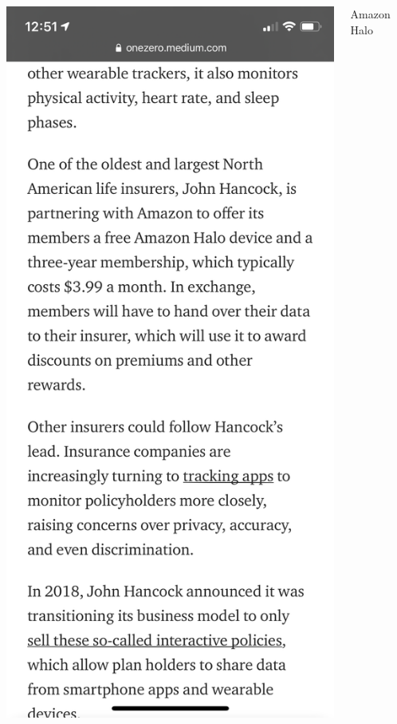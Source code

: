 \documentclass[main]{subfiles}
\begin{document}
\begin{frame}
\begin{columns}
\begin{column}{0.33\textwidth}
{\includegraphics[width=\textwidth]{figures/news/onezeroHalo.PNG}
}
\end{column}
\begin{column}{0.3\textwidth}

\centering
\vspace{-10em}
Amazon Halo
\end{column}
\end{columns}
\end{frame}
\end{document}
